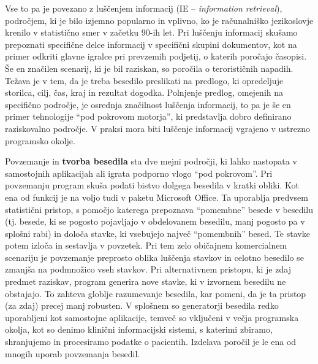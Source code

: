 \begin{multicols}{2}

Vse to pa je povezano z luščenjem informacij (IE – \textit{information retrieval}), področjem, ki je bilo izjemno popularno in vplivno, ko je računalniško jezikoslovje krenilo v statistično smer v začetku 90-ih let. Pri luščenju informacij skušamo prepoznati specifične delce informacij v specifični skupini dokumentov, kot na primer odkriti glavne igralce pri prevzemih podjetij, o katerih poročajo časopisi. Še en značilen scenarij, ki je bil raziskan, so poročila o terorističnih napadih. Težava je v tem, da je treba besedilo preslikati na predlogo, ki opredeljuje storilca, cilj, čas, kraj in rezultat dogodka. Polnjenje predlog, omejenih na specifično področje, je osrednja značilnost luščenja informacij, to pa je še en primer tehnologije “pod pokrovom motorja”, ki predstav\-lja dobro definirano raziskovalno področje. V praksi mora biti luščenje informacij vgrajeno v ustrezno programsko okolje.

Povzemanje in \textbf{tvorba besedila} sta dve mejni področji, ki lahko nastopata v samostojnih aplikacijah ali igrata podporno vlogo “pod pokrovom”. Pri povzemanju program skuša podati bistvo dolgega besedila v kratki obliki. Kot ena od funkcij je na voljo tudi v paketu Microsoft Office. Ta uporab\-lja predvsem statistični pristop, s pomočjo katerega prepoznava “pomembne” besede v besedilu (tj. besede, ki se pogosto pojav\-ljajo v obdelovanem besedilu, manj pogosto pa v splošni rabi) in določa stavke, ki vsebujejo naj\-več “pomembnih” besed. Te stavke potem izloča in sestav\-lja v povzetek. Pri tem zelo običajnem komercialnem scenariju je povzemanje preprosto oblika luščenja stavkov in celotno besedilo se zmanjša na podmnožico vseh stavkov. Pri alternativnem pristopu, ki je zdaj predmet raziskav, program generira nove stavke, ki v izvornem besedilu ne obstajajo. To zah\-teva glob\-lje razumevanje besedila, kar po\-meni, da je ta pristop (za zdaj) precej manj robusten. V splošnem so generatorji besedila redko uporab\-ljeni kot samostojne aplikacije, temveč so vključeni v večja programska okolja, kot so denimo klinični informacij\-ski sistemi, s katerimi zbiramo, shranjujemo in procesiramo podatke o pacientih. Izdelava poročil je le ena od mnogih uporab povzemanja besedil.



\end{multicols}
